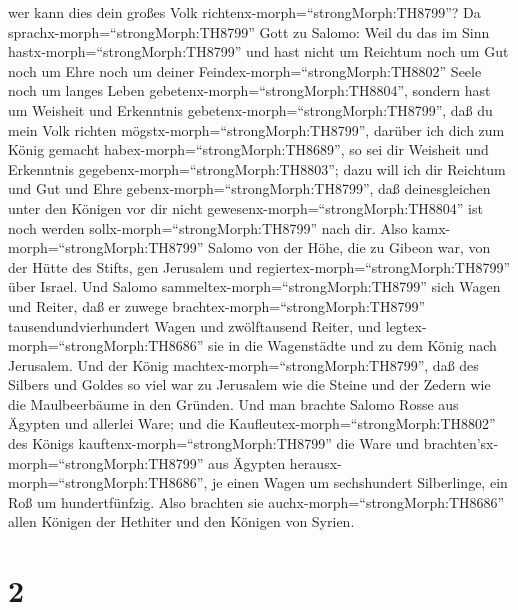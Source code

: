 wer kann dies dein großes Volk richtenx-morph=``strongMorph:TH8799''?
 Da sprachx-morph=``strongMorph:TH8799'' Gott zu Salomo:
Weil du das im Sinn hastx-morph=``strongMorph:TH8799'' und hast nicht um
Reichtum noch um Gut noch um Ehre noch um deiner
Feindex-morph=``strongMorph:TH8802'' Seele noch um langes Leben
gebetenx-morph=``strongMorph:TH8804'', sondern hast um Weisheit und
Erkenntnis gebetenx-morph=``strongMorph:TH8799'', daß du mein Volk
richten mögstx-morph=``strongMorph:TH8799'', darüber ich dich zum König
gemacht habex-morph=``strongMorph:TH8689'',  so sei dir
Weisheit und Erkenntnis gegebenx-morph=``strongMorph:TH8803''; dazu will
ich dir Reichtum und Gut und Ehre gebenx-morph=``strongMorph:TH8799'',
daß deinesgleichen unter den Königen vor dir nicht
gewesenx-morph=``strongMorph:TH8804'' ist noch werden
sollx-morph=``strongMorph:TH8799'' nach dir.  Also
kamx-morph=``strongMorph:TH8799'' Salomo von der Höhe, die zu Gibeon
war, von der Hütte des Stifts, gen Jerusalem und
regiertex-morph=``strongMorph:TH8799'' über Israel.  Und
Salomo sammeltex-morph=``strongMorph:TH8799'' sich Wagen und Reiter, daß
er zuwege brachtex-morph=``strongMorph:TH8799'' tausendundvierhundert
Wagen und zwölftausend Reiter, und legtex-morph=``strongMorph:TH8686''
sie in die Wagenstädte und zu dem König nach Jerusalem. 
Und der König machtex-morph=``strongMorph:TH8799'', daß des Silbers und
Goldes so viel war zu Jerusalem wie die Steine und der Zedern wie die
Maulbeerbäume in den Gründen.  Und man brachte Salomo Rosse
aus Ägypten und allerlei Ware; und die
Kaufleutex-morph=``strongMorph:TH8802'' des Königs
kauftenx-morph=``strongMorph:TH8799'' die Ware  und
brachten'sx-morph=``strongMorph:TH8799'' aus Ägypten
herausx-morph=``strongMorph:TH8686'', je einen Wagen um sechshundert
Silberlinge, ein Roß um hundertfünfzig. Also brachten sie
auchx-morph=``strongMorph:TH8686'' allen Königen der Hethiter und den
Königen von Syrien.

\hypertarget{section-1}{%
\section{2}\label{section-1}}

